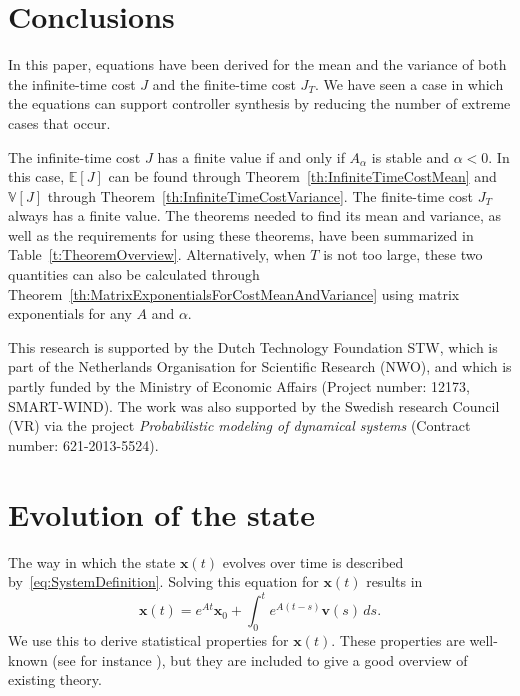 \documentclass[twocolumn]{autart}
\newcommand{\ve}[1]{{\boldsymbol{#1}}} \newcommand{\tr}{\mbox{tr}} \newcommand{\ex}{\mathds{E}} \newcommand{\va}{\mathds{V}}
\begin{document}
\section{Conclusions} \label{s:ConclusionsAndRecommendations}

In this paper, equations have been derived for the mean and the variance of both the infinite-time cost $J$ and the finite-time cost $J_T$. We have seen a case in which the equations can support controller synthesis by reducing the number of extreme cases that occur.

The infinite-time cost $J$ has a finite value if and only if $A_\alpha$ is stable and $\alpha < 0$. In this case, $\ex[J]$ can be found through Theorem~\ref{th:InfiniteTimeCostMean} and $\va[J]$ through Theorem~\ref{th:InfiniteTimeCostVariance}. The finite-time cost $J_T$ always has a finite value. The theorems needed to find its mean and variance, as well as the requirements for using these theorems, have been summarized in Table~\ref{t:TheoremOverview}. Alternatively, when $T$ is not too large, these two quantities can also be calculated through Theorem~\ref{th:MatrixExponentialsForCostMeanAndVariance} using matrix exponentials for any $A$ and $\alpha$.

\begin{ack}
This research is supported by the Dutch Technology Foundation STW, which is part of the Netherlands Organisation for Scientific Research (NWO), and which is partly funded by the Ministry of Economic Affairs (Project number: 12173, SMART-WIND). The work was also supported by the Swedish research Council (VR) via the project \emph{Probabilistic modeling of dynamical systems} (Contract number: 621-2013-5524).
\end{ack}

\appendix

\section{Evolution of the state} \label{s:StateEvolution}

The way in which the state $\ve{x}(t)$ evolves over time is described by~\eqref{eq:SystemDefinition}. Solving this equation for $\ve{x}(t)$ results in
\begin{equation}
\ve{x}(t) = e^{A t} \ve{x}_0 + \int_0^t e^{A(t-s)} \ve{v}(s) \, ds.\label{eq:StateSolution}
\end{equation}
We use this to derive statistical properties for $\ve{x}(t)$. These properties are well-known (see for instance \cite{DMCSBook}), but they are included to give a good overview of existing theory.
\end{document}
